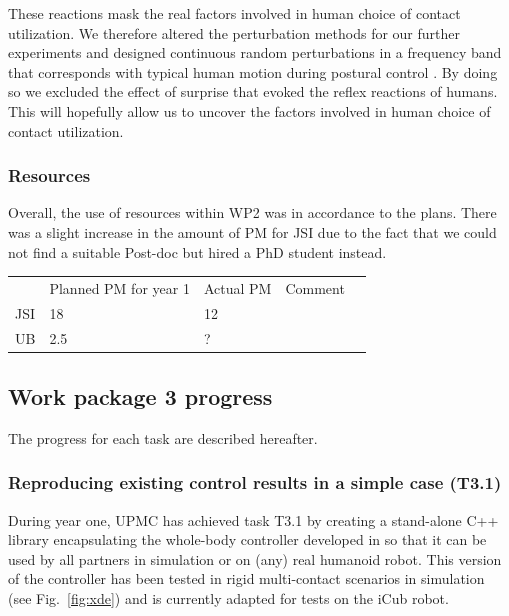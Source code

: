 \documentclass[12pt,a4paper,twoside]{article}
\begin{document}
These reactions mask the real factors involved in human choice of contact utilization. We therefore altered the perturbation methods for our further experiments and designed continuous random perturbations in a frequency band that corresponds with typical human motion during postural control \cite{Nawayseh2006}. By doing so we excluded the effect of surprise that evoked the reflex reactions of humans. This will hopefully allow us to uncover the factors involved in human choice of contact utilization.

\subsubsection{Resources}
Overall, the use of resources within WP2 was in accordance to the plans. There was a slight increase in the amount of PM for JSI due to the fact that we could not find a suitable Post-doc but hired a PhD student instead.

\begin{center}
\begin{tabular}{|l|l|l|l|l}
\cline{1-4}
 & Planned PM for year 1 & Actual PM & Comment & \\ \cline{1-4}
JSI & 18 & 12 &  &  \\ \cline{1-4}
UB & 2.5 & ? &  &  \\ \cline{1-4}
\end{tabular}
\end{center}

\subsection{Work package 3 progress}

The progress for each task are described hereafter.

\subsubsection{Reproducing existing control results in a simple case (T3.1)}
During year one, UPMC has achieved task T3.1 by creating a stand-alone C++ library encapsulating the whole-body controller developed in \cite{salini2012} so that it can be used by all partners in simulation or on (any) real humanoid robot. This version of the controller has been tested in rigid multi-contact scenarios in simulation (see Fig.~\ref{fig:xde}) and is currently adapted for tests on the iCub robot.
\end{document}
